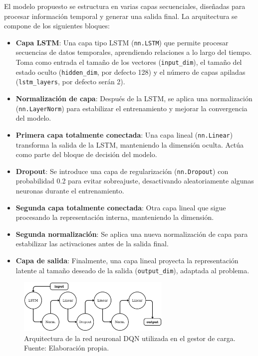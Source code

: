 El modelo propuesto se estructura en varias capas secuenciales, diseñadas para procesar información
temporal y generar una salida final. La arquitectura se compone de los siguientes bloques:
\begin{itemize}
    \item \textbf{Capa LSTM}: Una capa tipo LSTM (\texttt{nn.LSTM}) que permite procesar secuencias 
    de datos temporales, aprendiendo relaciones a lo largo del tiempo. Toma como entrada el tamaño 
    de los vectores (\texttt{input\_dim}), el tamaño del estado oculto (\texttt{hidden\_dim}, por 
    defecto 128) y el número de capas apiladas (\texttt{lstm\_layers}, por defecto serán 2).
    
    \item \textbf{Normalización de capa}: Después de la LSTM, se aplica una normalización 
    (\texttt{nn.LayerNorm}) para estabilizar el entrenamiento y mejorar la convergencia del modelo.

    \item \textbf{Primera capa totalmente conectada}: Una capa lineal (\texttt{nn.Linear}) transforma 
    la salida de la LSTM, manteniendo la dimensión oculta. Actúa como parte del bloque de decisión 
    del modelo.

    \item \textbf{Dropout}: Se introduce una capa de regularización (\texttt{nn.Dropout}) con 
    probabilidad 0.2 para evitar sobreajuste, desactivando aleatoriamente algunas neuronas durante 
    el entrenamiento.

    \item \textbf{Segunda capa totalmente conectada}: Otra capa lineal que sigue procesando la 
    representación interna, manteniendo la dimensión.

    \item \textbf{Segunda normalización}: Se aplica una nueva normalización de capa para estabilizar 
    las activaciones antes de la salida final.

    \item \textbf{Capa de salida}: Finalmente, una capa lineal proyecta la representación latente 
    al tamaño deseado de la salida (\texttt{output\_dim}), adaptada al problema.
\end{itemize}

\begin{figure}[H]
    \centering
    \includegraphics[width=0.65\textwidth]{images/gestor_arch.png}
    \caption{Arquitectura de la red neuronal DQN utilizada en el gestor de carga. Fuente: 
    Elaboración propia.}
    \label{fig:arch_dqn}
\end{figure}

